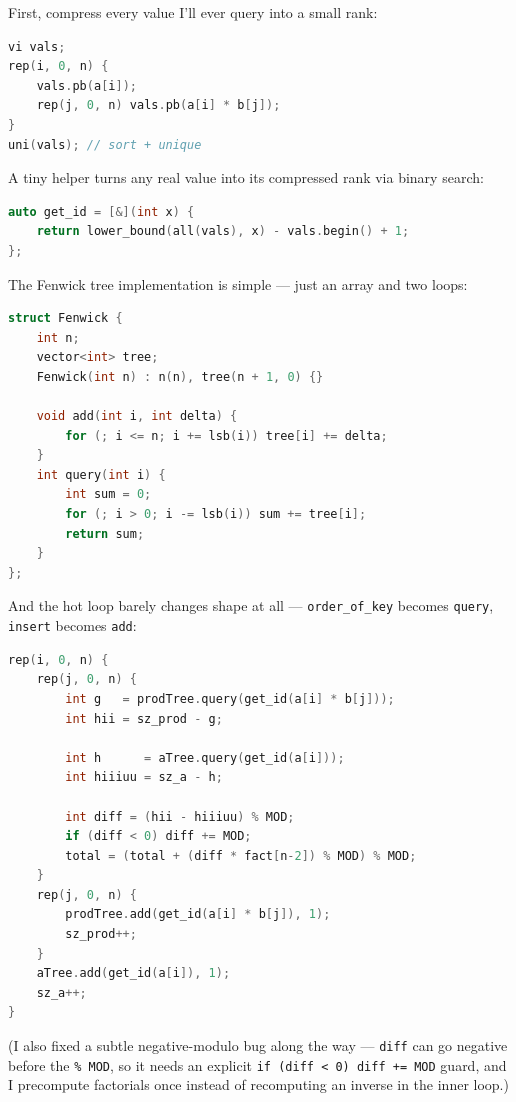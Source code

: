 \documentclass[11pt,a4paper]{article}
\begin{document}
First, compress every value I'll ever query into a small rank:

\begin{lstlisting}[language=C++]
vi vals;
rep(i, 0, n) {
    vals.pb(a[i]);
    rep(j, 0, n) vals.pb(a[i] * b[j]);
}
uni(vals); // sort + unique
\end{lstlisting}

A tiny helper turns any real value into its compressed rank via binary search:

\begin{lstlisting}[language=C++]
auto get_id = [&](int x) {
    return lower_bound(all(vals), x) - vals.begin() + 1;
};
\end{lstlisting}

The Fenwick tree implementation is simple --- just an array and two loops:

\begin{lstlisting}[language=C++]
struct Fenwick {
    int n;
    vector<int> tree;
    Fenwick(int n) : n(n), tree(n + 1, 0) {}

    void add(int i, int delta) {
        for (; i <= n; i += lsb(i)) tree[i] += delta;
    }
    int query(int i) {
        int sum = 0;
        for (; i > 0; i -= lsb(i)) sum += tree[i];
        return sum;
    }
};
\end{lstlisting}

And the hot loop barely changes shape at all --- \texttt{order\_of\_key} becomes \texttt{query}, \texttt{insert} becomes \texttt{add}:

\begin{lstlisting}[language=C++]
rep(i, 0, n) {
    rep(j, 0, n) {
        int g   = prodTree.query(get_id(a[i] * b[j]));
        int hii = sz_prod - g;

        int h      = aTree.query(get_id(a[i]));
        int hiiiuu = sz_a - h;

        int diff = (hii - hiiiuu) % MOD;
        if (diff < 0) diff += MOD;
        total = (total + (diff * fact[n-2]) % MOD) % MOD;
    }
    rep(j, 0, n) {
        prodTree.add(get_id(a[i] * b[j]), 1);
        sz_prod++;
    }
    aTree.add(get_id(a[i]), 1);
    sz_a++;
}
\end{lstlisting}

(I also fixed a subtle negative-modulo bug along the way --- \texttt{diff} can go negative before the \texttt{\% MOD}, so it needs an explicit \texttt{if (diff \textless{} 0) diff += MOD} guard, and I precompute factorials once instead of recomputing an inverse in the inner loop.)
\end{document}
